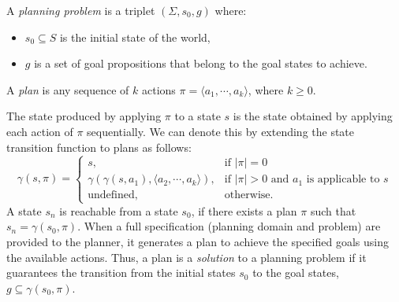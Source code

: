 \begin{definition}
A \textit{planning problem} is a triplet $(\Sigma, s_0, g)$ where:
\begin{itemize}
	\item $s_0 \subseteq S$ is the initial state of the world,
	\item $g$ is a set of goal propositions that belong to the goal states to achieve.
\end{itemize}
\end{definition}

\begin{definition}
	A \textit{plan} is any sequence of $k$ actions $\pi = \langle a_1,\cdots, a_k\rangle$, where $k\geq 0$. 
\end{definition}
The state produced by applying $\pi$ to a state $s$ is the state obtained by applying each action of $\pi$ sequentially. 
We can denote this by extending the state transition function to plans as follows:
\[\gamma(s,\pi)=\left\{
\begin{array}{ll}
s, &\mbox{if $|\pi|=0$} \\
\gamma(\gamma(s,a_1),\langle a_2,\cdots, a_k\rangle ), &\mbox{if $|\pi|>0$ and $a_1$ is applicable to $s$} \\
\mbox{undefined}, &\mbox{otherwise.}
\end{array}
\right.
\]
A state $s_n$ is reachable from a state $s_0$, if there exists a plan $\pi$ such that $s_{n} = \gamma(s_0, \pi)$.
When a full specification (planning domain and problem) are provided to the planner, it generates a plan to achieve the specified goals using the available actions.
Thus, a plan is a \textit{solution} to a planning problem if it guarantees the transition from the initial states $s_0$ to the goal states, \ie $g \subseteq \gamma (s_0,\pi)$. 




